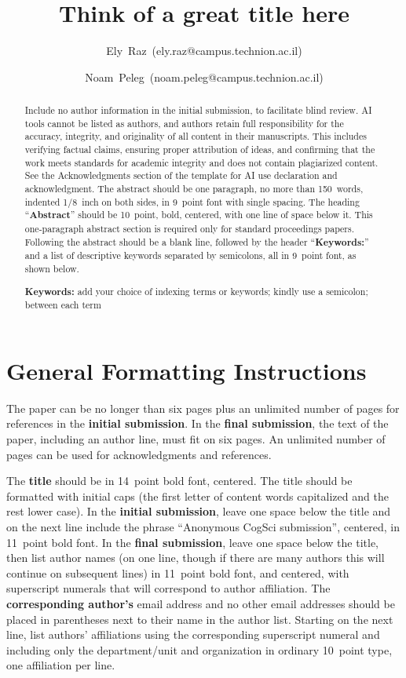 \documentclass[10pt,letterpaper]{article}
\title{Think of a great title here}
\author[1]{\mbox{Ely Raz (ely.raz@campus.technion.ac.il)}}
\author[2]{\mbox{Noam Peleg (noam.peleg@campus.technion.ac.il)}}
\begin{document}
\maketitle

\begin{abstract}
Include no author information in the initial submission, to facilitate blind review. AI tools cannot
be listed as authors, and authors retain full responsibility for the accuracy, integrity, and
originality of all content in their manuscripts. This includes verifying factual claims, ensuring
proper attribution of ideas, and confirming that the work meets standards for academic integrity and
does not contain plagiarized content. See the Acknowledgments section of the template for AI use
declaration and acknowledgment. The abstract should be one paragraph, no more than 150~words,
indented 1/8~inch on both sides, in 9~point font with single spacing. The heading
``\textbf{Abstract}'' should be 10~point, bold, centered, with one line of space below it. This
one-paragraph abstract section is required only for standard proceedings papers. Following the
abstract should be a blank line, followed by the header ``\textbf{Keywords:}'' and a list of
descriptive keywords separated by semicolons, all in 9~point font, as shown below.

\textbf{Keywords:}
add your choice of indexing terms or keywords;
kindly use a semicolon;
between each term
\end{abstract}

\section{General Formatting Instructions}

The paper can be no longer than six pages plus an unlimited number of pages for references in the
\textbf{initial submission}. In the \textbf{final submission}, the text of the paper, including an
author line, must fit on six pages. An unlimited number of pages can be used for acknowledgments
and references.

The \textbf{title} should be in 14~point bold font, centered. The title should be formatted with
initial caps (the first letter of content words capitalized and the rest lower case). In the
\textbf{initial submission}, leave one space below the title and on the next line include the
phrase ``Anonymous CogSci submission'', centered, in 11~point bold font. In the \textbf{final
  submission}, leave one space below the title, then list author names (on one line, though if there
are many authors this will continue on subsequent lines) in 11~point bold font, and centered, with
superscript numerals that will correspond to author affiliation. The \textbf{corresponding
  author's} email address and no other email addresses should be placed in parentheses next to their
name in the author list. Starting on the next line, list authors' affiliations using the
corresponding superscript numeral and including only the department/unit and organization in
ordinary 10~point type, one affiliation per line.
\end{document}
